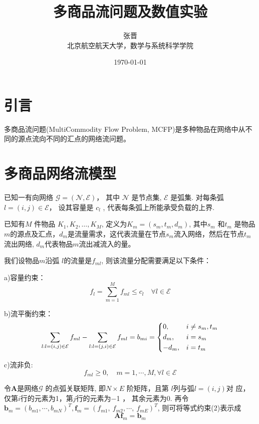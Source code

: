 \documentclass[UTF8]{ctexart}
\title{\heiti 多商品流问题及数值实验}
\author{\kaishu 张晋\\
				\kaishu 北京航空航天大学，数学与系统科学学院}
\date{\today}
\begin{document}
\maketitle
\newpage
\section{引言}
    {\enspace}{
多商品流问题(MultiCommodity Flow Problem, MCFP)是多种物品在网络中从不同的源点流向不同的汇点的网络流问题。
}

\section{多商品网络流模型}
已知一有向网络 $\mathcal{G}=(\mathcal{N},\mathcal{E})$，
其中 $\mathcal{N}$ 是节点集, $\mathcal{E}$ 是弧集. 
对每条弧 $l = (i, j) \in \mathcal{E} $，
设其容量是 $c_l$ , 代表每条弧上所能承受负载的上界.

已知有$M$ 件物品 $K_{1},K_{2},\dots ,K_{M}$,
定义为$K_{m}=(s_{m},t_{m},d_{m}) $,
其中$ s_{m}$ 和$t_{m}$ 是物品${m}$的源点及汇点，$ d_{m}$是流量需求，这代表流量在节点$s_m$流入网络，然后在节点$t_m$流出网络, $d_m$代表物品$m$流出减流入的量。

我们设物品$m$沿弧 $l$的流量是$f_{ml} $,
则该流量分配需要满足以下条件：

a)容量约束：
\begin{equation}
f_l=\sum_{m=1}^{M} f_{ml} \leq c_l\quad \forall l \in\mathcal{E} 
\end{equation}

b)流平衡约束：
\begin{equation}
\sum_{l:l=(i,j)\in \mathcal{E}} f_{ml} -\sum_{l:l=(j,i)\in \mathcal{E}} f_{ml}
=b_{mi}=
\begin{dcases}  
0,& i \neq s_m,t_m\\
d_m,& i=s_m\\
-d_m,& i=t_m
\end{dcases}
\end{equation}

c)流非负:
\begin{equation}
f_{ml}\geq 0,\quad m=1,\cdots,M,\forall l \in \mathcal{E}
\end{equation}


令$\bm{A}$是网络$\mathcal{G}$ 的点弧关联矩阵,
即$N \times E$ 阶矩阵，且第 $l$列与弧$l = (i, j)$对
应，仅第$i$行的元素为1，第$ j$行的元素为−1 ，
其余元素为0. 再令$ \bm{b}_m=(b_{m1},\cdots,
b_{mN})^{T}, \bm{f}_m=(f_{m1},\ f_{m2}, \cdots,\ f_{mE})^T$,
则可将等式约束(2)表示成
\[\bm{A}\bm{f}_m=\bm{b}_m\]
\end{document}

